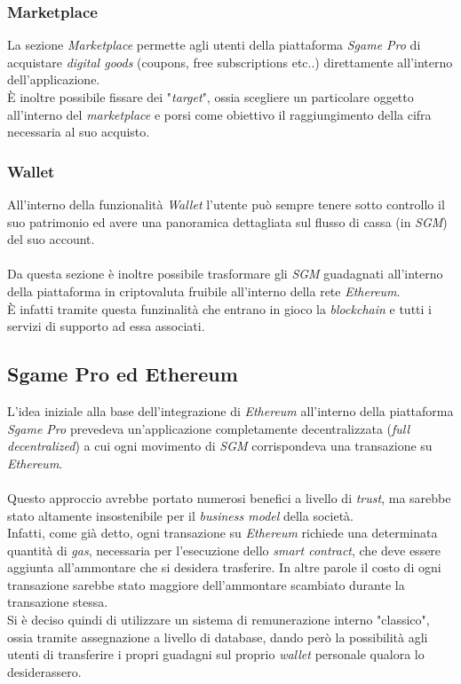 \documentclass[11pt]{thesistemp}
\begin{document}
\subsubsection{Marketplace}

La sezione \textit{Marketplace} permette agli utenti della piattaforma \textit{Sgame Pro} di acquistare \textit{digital goods} (coupons, free subscriptions etc..) direttamente all'interno dell'applicazione.\\
\`E inoltre possibile fissare dei "\textit{target}", ossia scegliere un particolare oggetto all'interno del \textit{marketplace} e porsi come obiettivo il raggiungimento della cifra necessaria al suo acquisto.

\subsubsection{Wallet}

All'interno della funzionalità \textit{Wallet} l'utente può sempre tenere sotto controllo il suo patrimonio ed avere una panoramica dettagliata sul flusso di cassa (in \textit{SGM}) del suo account.\\
\\
Da questa sezione è inoltre possibile trasformare gli \textit{SGM} guadagnati all'interno della piattaforma in criptovaluta fruibile all'interno della rete \textit{Ethereum}.\\
\`E infatti tramite questa funzinalità che entrano in gioco la \textit{blockchain} e tutti i servizi di supporto ad essa associati.
\pagebreak

\subsection{Sgame Pro ed Ethereum}

L'idea iniziale alla base dell'integrazione di \textit{Ethereum} all'interno della piattaforma \textit{Sgame Pro} prevedeva un'applicazione completamente decentralizzata (\textit{full decentralized}) a cui ogni movimento di \textit{SGM} corrispondeva una transazione su \textit{Ethereum}.\\\\
Questo approccio avrebbe portato numerosi benefici a livello di \textit{trust}, ma sarebbe stato altamente insostenibile per il \textit{business model} della società.\\
Infatti, come già detto, ogni transazione su \textit{Ethereum} richiede una determinata quantità di \textit{gas}, necessaria per l'esecuzione dello \textit{smart contract}, che deve essere aggiunta all'ammontare che si desidera trasferire.
In altre parole il costo di ogni transazione sarebbe stato maggiore dell'ammontare scambiato durante la transazione stessa.\\
Si è deciso quindi di utilizzare un sistema di remunerazione interno "classico", ossia tramite assegnazione a livello di database, dando però la possibilità agli utenti di transferire i propri guadagni sul proprio \textit{wallet} personale qualora lo desiderassero.
\end{document}
